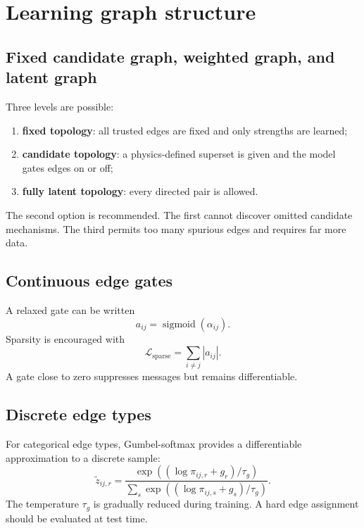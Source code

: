\documentclass[11pt]{article}
\newcommand{\sigmoid}{\operatorname{sigmoid}}
\newcommand{\Lsparse}{\mathcal{L}_{\mathrm{sparse}}}
\begin{document}
\section{Learning graph structure}

\subsection{Fixed candidate graph, weighted graph, and latent graph}

Three levels are possible:
\begin{enumerate}[leftmargin=1.6em]
    \item \textbf{fixed topology}: all trusted edges are fixed and only strengths are learned;
    \item \textbf{candidate topology}: a physics-defined superset is given and the model gates edges on or off;
    \item \textbf{fully latent topology}: every directed pair is allowed.
\end{enumerate}
The second option is recommended. The first cannot discover omitted candidate mechanisms. The third permits too many spurious edges and requires far more data.

\subsection{Continuous edge gates}

A relaxed gate can be written
\begin{equation}
a_{ij}=\sigmoid(\alpha_{ij}).
\end{equation}
Sparsity is encouraged with
\begin{equation}
\Lsparse=\sum_{i\neq j}|a_{ij}|.
\end{equation}
A gate close to zero suppresses messages but remains differentiable.

\subsection{Discrete edge types}

For categorical edge types, Gumbel-softmax provides a differentiable approximation to a discrete sample:
\begin{equation}
\tilde{z}_{ij,r}=\frac{\exp((\log\pi_{ij,r}+g_r)/\tau_g)}{\sum_s\exp((\log\pi_{ij,s}+g_s)/\tau_g)}.
\end{equation}
The temperature \(\tau_g\) is gradually reduced during training. A hard edge assignment should be evaluated at test time.
\end{document}
